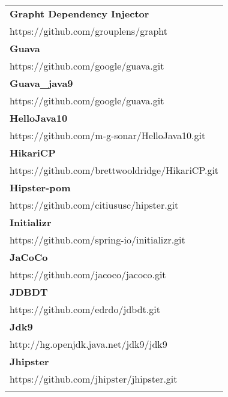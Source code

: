 \begin{table}[]
\small
\begin{tabular}{|p{130mm}|}
\hline 
\bf Grapht Dependency Injector                         \\ https://github.com/grouplens/grapht                                          \\ \hline \bf
Guava                                              \\ https://github.com/google/guava.git                                          \\ \hline \bf
Guava\_java9                                       \\ https://github.com/google/guava.git                                          \\ \hline \bf
HelloJava10                                        \\ https://github.com/m-g-sonar/HelloJava10.git                                 \\ \hline \bf
HikariCP                                           \\ https://github.com/brettwooldridge/HikariCP.git                              \\ \hline \bf
Hipster-pom                                        \\ https://github.com/citiususc/hipster.git                                     \\ \hline \bf
Initializr                                         \\ https://github.com/spring-io/initializr.git                                  \\ \hline \bf
JaCoCo                                             \\ https://github.com/jacoco/jacoco.git                                         \\ \hline \bf
JDBDT                                              \\ https://github.com/edrdo/jdbdt.git                                           \\ \hline \bf
Jdk9                                               \\ http://hg.openjdk.java.net/jdk9/jdk9                                         \\ \hline \bf
Jhipster                                           \\ https://github.com/jhipster/jhipster.git                                     \\ \hline \bf

\end{tabular}
\end{table}
